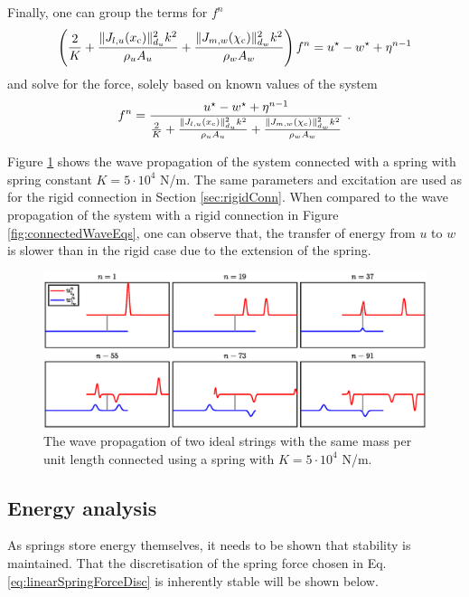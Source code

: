 Finally, one can group the terms for $f^n$ 
\begin{equation*}
    \left(\frac{2}{K} + \frac{\lVert J_{l, u}(x_{\text{c}})\rVert_{d_u}^2k^2}{\rho_u A_u} +  \frac{\lVert J_{m, w}(\chi_{\text{c}})\rVert_{d_w}^2k^2}{\rho_w A_w}\right)f^n = u^\star - w^\star + \eta^{n-1}
\end{equation*}
and solve for the force, solely based on known values of the system
\begin{equation}
    f^n = \frac{u^\star - w^\star + \eta^{n-1}}{\frac{2}{K} + \frac{\lVert J_{l, u}(x_{\text{c}})\rVert_{d_u}^2k^2}{\rho_u A_u} +  \frac{\lVert J_{m, w}(\chi_{\text{c}})\rVert_{d_w}^2k^2}{\rho_w A_w}}\ .
\end{equation}

Figure \ref{fig:connectedWaveEqsSpring} shows the wave propagation of the system connected with a spring with spring constant $K = 5\cdot 10^4$ N/m. The same parameters and excitation are used as for the rigid connection in Section \ref{sec:rigidConn}. When compared to the wave propagation of the system with a rigid connection in Figure \ref{fig:connectedWaveEqs}, one can observe that, the transfer of energy from $u$ to $w$ is slower than in the rigid case due to the extension of the spring.

\begin{figure}[h]
    \includegraphics[width=\textwidth]{figures/interactions/connectedWaveEqsSpring.eps}
    \caption{The wave propagation of two ideal strings with the same mass per unit length connected using a spring with $K = 5 \cdot 10^4$ N/m. \label{fig:connectedWaveEqsSpring}}
\end{figure}

\subsection{Energy analysis}\label{sec:conn1DwaveEnergySpring}
As springs store energy themselves, it needs to be shown that stability is maintained. That the discretisation of the spring force chosen in Eq. \eqref{eq:linearSpringForceDisc} is inherently stable will be shown below. 

